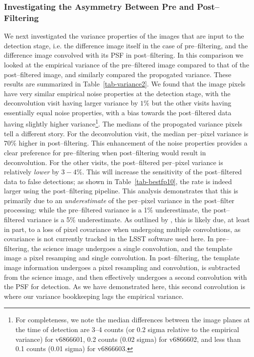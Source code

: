 \documentclass[iop]{emulateapj}
\begin{document}
\subsubsection{Investigating the Asymmetry Between Pre and Post--Filtering}

We next investigated the variance properties of the images that are input to the detection stage, i.e. the difference image itself in the case of pre--filtering, and the difference image convolved with its PSF in post--filtering.
In this comparison we looked at the empirical variance of the pre--filtered image compared to that of the post--filtered image, and similarly compared the propogated variance.
These results are summarized in Table~\ref{tab-variance2}.
We found that the image pixels have very similar empirical noise properties at the detection stage, with the deconvolution visit having larger variance by $1\%$ but the other visits having essentially equal noise properties, with a bias towards the post--filtered data having slightly higher variance\footnote{For completeness, we note the median differences between the image planes at the time of detection are 3--4 counts (or 0.2 sigma relative to the empirical variance) for v6866601, 0.2 counts (0.02 sigma) for v6866602, and less than 0.1 counts (0.01 sigma) for v6866603.}.
The medians of the propogated variance pixels tell a different story.
For the deconvolution visit, the median per--pixel variance is $70\%$ higher in post--filtering.
This enhancement of the noise properties provides a clear preference for pre--filtering when post--filtering would result in deconvolution.
For the other visits, the post--filtered per--pixel variance is relatively {\it lower} by $3-4\%$.
This will increase the sensitivity of the post--filtered data to false detections; as shown in Table~\ref{tab-bestfp10}, the rate is indeed larger using the post--filtering pipeline.
This analysis demonstrates that this is primarily due to an {\it underestimate} of the per--pixel variance in the post--filter processing: while the pre--filtered variance is a 1\% underestimate, the post--filtered variance is a 5\% underestimate.
As outlined by \cite{Price-Stacking}, this is likely due, at least in part, to a loss of pixel covariance when undergoing multiple convolutions, as covariance is not currently tracked in the LSST software used here.
In pre--filtering, the science image undergoes a single convolution, and the template image a pixel resamping and single convolution.
In post--filtering, the template image information undergoes a pixel resampling and convolution, is subtracted from the science image, and then effectively undergoes a second convolution with the PSF for detection.
As we have demonstrated here, this second convolution is where our variance bookkeeping lags the empirical variance.
\end{document}
